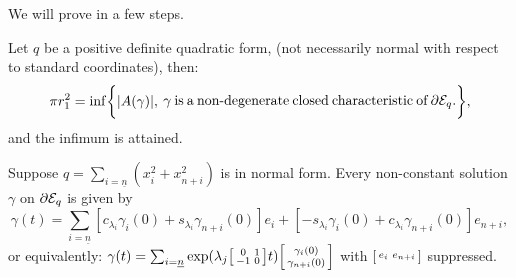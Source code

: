 \documentclass[../main-v2-manifolds.tex]{subfiles}
\begin{document}
We will prove  in a few steps.
\begin{wts}\label{thm:symplectic action on the boundary of ellipsoids}
    Let $q$ be a positive definite quadratic form, (not necessarily normal with respect to standard coordinates), then:
    \[
        \pi r_1^2 = \inf\bigset{\abs{A(\gamma)},\: \parbox{21em}{$\gamma$ is a non-degenerate closed characteristic of $\partial \Epsilon_q$.}},
    \]
    and the infimum is attained.
\end{wts}
\begin{step}
    Suppose $q = \sum_{i=\underline{n}}(x^2_{i} + x^2_{n+i})$ is in normal form. Every non-constant solution $\gamma$ on $\partial \mathcal{E}_q$ is given by
    \[
        \gamma(t) = \sum_{i=\underline{n}} [c_{\lambda_i}\gamma_i(0) + s_{\lambda_i}\gamma_{n+i}(0)]e_i + [-s_{\lambda_i}\gamma_i(0) + c_{\lambda_i}\gamma_{n+i}(0)]e_{n+i},
    \]
    or equivalently: $\gamma(t) = \sum_{i=\underline{n}}\operatorname{exp}(\lambda_j\begin{bsmallmatrix} 0 & 1 \\ -1 & 0 \end{bsmallmatrix} t)\begin{bsmallmatrix}
            \gamma_i(0) \\ \gamma_{n+i}(0)
        \end{bsmallmatrix}$ with $\begin{bsmallmatrix} e_i & e_{n+i} \end{bsmallmatrix}$ suppressed.
\end{step}
\end{document}
